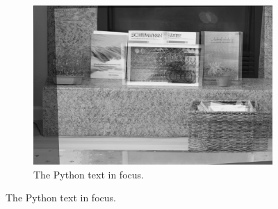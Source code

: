 \documentclass[a4paper]{article}
\begin{document}
\begin{figure}
\begin{subfigure}[b]{0.3\textwidth}
        \includegraphics[width=\textwidth]{../Plane_Sweeping/Iwarp14.jpg}
        \caption{The Python text in focus.}
        \label{fig:swpln3}
    \end{subfigure}
\end{figure}
\end{document}
